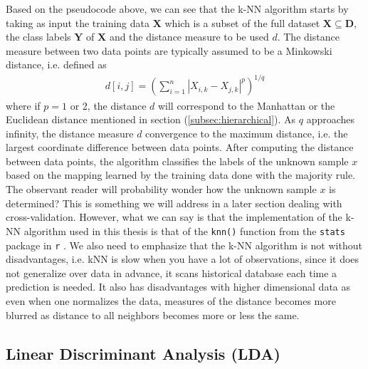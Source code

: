 \documentclass[../thesis.tex]{subfiles}
\begin{document}
\noindent Based on the pseudocode above, we can see that the k-NN algorithm starts by taking as input the training data $\mathbf{X}$ which is a subset of the full dataset ${\displaystyle \mathbf{X}\subseteq \mathbf{D}}$, the class labels $\mathbf{Y}$ of $\mathbf{X}$ and the distance measure to be used $d$. The distance measure between two data points are typically assumed to be a Minkowski distance, i.e. defined as
\begin{align}
    d[i,j] = \left(\sum_{i=1}^n |X_{i, k} - X_{j, k}|^p\right)^{1/q}
\end{align}
where if $p=1$ or 2, the distance $d$ will correspond to the Manhattan or the Euclidean distance mentioned in section (\ref{subsec:hierarchical}). As $q$ approaches infinity, the distance measure $d$ convergence to the maximum distance, i.e. the largest coordinate difference between data points. After computing the distance between data points, the algorithm classifies the labels of the unknown sample $x$ based on the mapping learned by the training data done with the majority rule.\\
\indent The observant reader will probability wonder how the unknown sample $x$ is determined? This is something we will address in a later section dealing with cross-validation. However, what we can say is that the implementation of the k-NN algorithm used in this thesis is that of the \texttt{knn()} function from the \texttt{stats} package in \texttt{r} \citep{stats}. We also need to emphasize that the k-NN algorithm is not without disadvantages, i.e.  kNN is slow when you have a lot of observations, since it does not generalize over data in advance, it scans historical database each time a prediction is needed. It also has disadvantages with higher dimensional data as even when one normalizes the data, measures of the distance becomes more blurred as distance to all neighbors becomes more or less the same.  

\subsection{Linear Discriminant Analysis (LDA)}
\label{subsec:lda}
\end{document}

